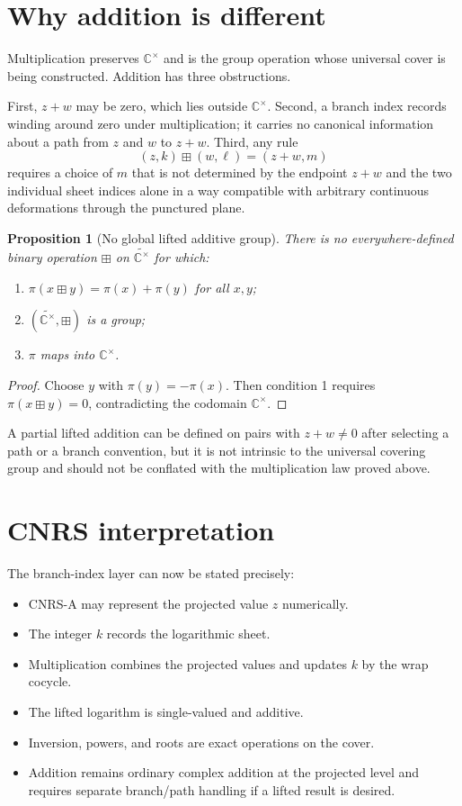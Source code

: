 \documentclass[11pt]{article}
\newtheorem{proposition}[theorem]{Proposition}
\newcommand{\C}{\mathbb C}
\newcommand{\wtC}{\widetilde{\C^{\times}}}
\begin{document}
\section{Why addition is different}
Multiplication preserves $\C^{\times}$ and is the group operation whose universal cover is being constructed.  Addition has three obstructions.

First, $z+w$ may be zero, which lies outside $\C^{\times}$.  Second, a branch index records winding around zero under multiplication; it carries no canonical information about a path from $z$ and $w$ to $z+w$.  Third, any rule
\[
(z,k)\boxplus(w,\ell)=(z+w,m)
\]
requires a choice of $m$ that is not determined by the endpoint $z+w$ and the two individual sheet indices alone in a way compatible with arbitrary continuous deformations through the punctured plane.

\begin{proposition}[No global lifted additive group]
There is no everywhere-defined binary operation $\boxplus$ on $\wtC$ for which:
\begin{enumerate}
\item $\pi(x\boxplus y)=\pi(x)+\pi(y)$ for all $x,y$;
\item $(\wtC,\boxplus)$ is a group;
\item $\pi$ maps into $\C^{\times}$.
\end{enumerate}
\end{proposition}

\begin{proof}
Choose $y$ with $\pi(y)=-\pi(x)$.  Then condition 1 requires $\pi(x\boxplus y)=0$, contradicting the codomain $\C^{\times}$.
\end{proof}

A partial lifted addition can be defined on pairs with $z+w\ne0$ after selecting a path or a branch convention, but it is not intrinsic to the universal covering group and should not be conflated with the multiplication law proved above.

\section{CNRS interpretation}
The branch-index layer can now be stated precisely:
\begin{itemize}
\item CNRS-A may represent the projected value $z$ numerically.
\item The integer $k$ records the logarithmic sheet.
\item Multiplication combines the projected values and updates $k$ by the wrap cocycle.
\item The lifted logarithm is single-valued and additive.
\item Inversion, powers, and roots are exact operations on the cover.
\item Addition remains ordinary complex addition at the projected level and requires separate branch/path handling if a lifted result is desired.
\end{itemize}
\end{document}
